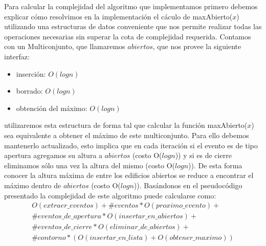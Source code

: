Para calcular la complejidad del algoritmo que implementamos primero debemos
explicar cómo resolvimos en la implementación el cáculo de maxAbierto($x$) 
utilizando una estructuras de datos conveniente que nos permite realizar todas las
operaciones necesarias sin superar la cota de complejidad requerida.
Contamos con un Multiconjunto, que llamaremos $abiertos$, que nos provee la
siguiente interfaz:
\begin{itemize}
	\item inserción: $O(log n)$
	\item borrado: $O(log n)$
	\item obtención del máximo: $O(log n)$
\end{itemize}
utilizaremos esta estructura de forma tal que calcular la función maxAbierto($x$)
sea equivalente a obtener el máximo de este multiconjunto. Para ello debemos
mantenerlo actualizado, esto implica que en cada iteración si el evento es de tipo
apertura agregamos su altura a $abiertos$ (costo O($log n$)) y si es de cierre 
eliminamos sólo una vez la altura del mismo (costo O($log n$)). De esta forma
conocer la altura máxima de entre los edificios abiertos se reduce a encontrar el 
máximo dentro de $abiertos$ (costo O($log n$)).
Basándonos en el pseudocódigo presentado la complejidad de este algoritmo puede 
calcularse como:
\begin{equation}
\begin{split}
	O(extraer\_eventos) + \#eventos * O(proximo\_evento) + \\
	\#eventos\_de\_apertura * O(insertar\_en\_abiertos) + \\
	\#eventos\_de\_cierre * O(eliminar\_de\_abiertos) + \\
	\#contorno * (O(insertar\_en\_lista) + O(obtener\_maximo))
\end{split}
\end{equation}
